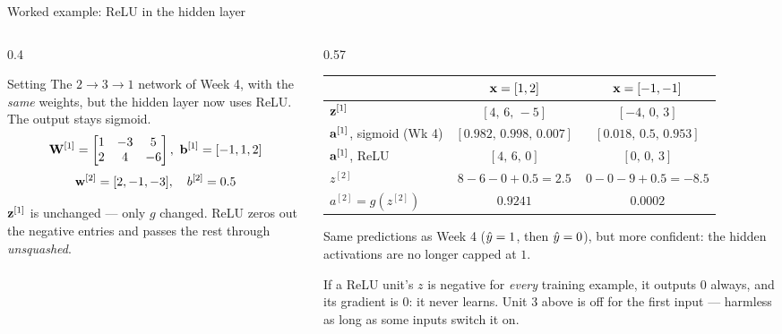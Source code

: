 \documentclass[aspectratio=169,10pt]{beamer}
\begin{document}
\begin{frame}{Worked example: ReLU in the hidden layer}
  \footnotesize
  \begin{columns}[T,onlytextwidth]
    \begin{column}{0.4\textwidth}
      \begin{block}{Setting}
        The $2\to3\to1$ network of Week 4, with the \emph{same} weights, but the hidden
        layer now uses ReLU. The output stays sigmoid.
        \[ \mW^{[1]}=\begin{bmatrix}1&-3&5\\2&4&-6\end{bmatrix},\ \mathbf{b}^{[1]}=[-1,1,2] \]
        \[ \mathbf{w}^{[2]}=[2,-1,-3],\quad b^{[2]}=0.5 \]
      \end{block}
      \begin{keyidea}
        $\mathbf{z}^{[1]}$ is unchanged --- only $g$ changed. ReLU zeros out the negative entries
        and passes the rest through \emph{unsquashed}.
      \end{keyidea}
    \end{column}
    \begin{column}{0.57\textwidth}
      \renewcommand{\arraystretch}{1.25}\setlength{\tabcolsep}{4pt}
      \begin{tabular}{@{}lcc@{}}
        \toprule
        & $\mathbf{x}=[1,2]$ & $\mathbf{x}=[-1,-1]$\\
        \midrule
        $\mathbf{z}^{[1]}$ & $[4,\,6,\,-5]$ & $[-4,\,0,\,3]$\\
        $\mathbf{a}^{[1]}$, sigmoid (Wk 4) & $[0.982,\,0.998,\,0.007]$ & $[0.018,\,0.5,\,0.953]$\\
        $\mathbf{a}^{[1]}$, ReLU & $[4,\,6,\,0]$ & $[0,\,0,\,3]$\\
        $z^{[2]}$ & $8-6-0+0.5=2.5$ & $0-0-9+0.5=-8.5$\\
        $a^{[2]}=g(z^{[2]})$ & $\mathbf{0.9241}$ & $\mathbf{0.0002}$\\
        \bottomrule
      \end{tabular}
      \vspace{2mm}

      Same predictions as Week 4 ($\hat{y}=1$, then $\hat{y}=0$), but more confident: the
      hidden activations are no longer capped at $1$.
      \begin{pitfall}
        \footnotesize If a ReLU unit's $z$ is negative for \emph{every} training example,
        it outputs $0$ always, and its gradient is $0$: it never learns. Unit 3 above is
        off for the first input --- harmless as long as some inputs switch it on.
      \end{pitfall}
    \end{column}
  \end{columns}
\end{frame}
\end{document}

